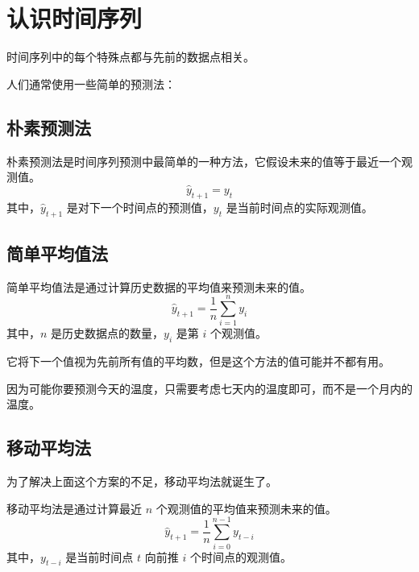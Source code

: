 \section{认识时间序列}

\begin{definition}[时间序列]
    时间序列中的每个特殊点都与先前的数据点相关。
\end{definition}

人们通常使用一些简单的预测法：

\subsection{朴素预测法}

\begin{theorem}
    朴素预测法是时间序列预测中最简单的一种方法，它假设未来的值等于最近一个观测值。
    \begin{equation}
        \hat{y}_{t+1} = y_t
    \end{equation}
    其中，$\hat{y}_{t+1}$ 是对下一个时间点的预测值，$y_t$ 是当前时间点的实际观测值。
\end{theorem}

\subsection{简单平均值法}

\begin{theorem}[简单平均值法]
    简单平均值法是通过计算历史数据的平均值来预测未来的值。
    \begin{equation}
        \hat{y}_{t+1} = \frac{1}{n} \sum_{i=1}^{n} y_i
    \end{equation}
    其中，$n$ 是历史数据点的数量，$y_i$ 是第 $i$ 个观测值。
\end{theorem}

\begin{tips}
    它将下一个值视为先前所有值的平均数，但是这个方法的值可能并不都有用。

    因为可能你要预测今天的温度，只需要考虑七天内的温度即可，而不是一个月内的温度。
\end{tips}

\subsection{移动平均法}

为了解决上面这个方案的不足，移动平均法就诞生了。

\begin{theorem}[移动平均法]
    移动平均法是通过计算最近 $n$ 个观测值的平均值来预测未来的值。
    \begin{equation}
        \hat{y}_{t+1} = \frac{1}{n} \sum_{i=0}^{n-1} y_{t-i}
    \end{equation}
    其中，$y_{t-i}$ 是当前时间点 $t$ 向前推 $i$ 个时间点的观测值。
\end{theorem}

